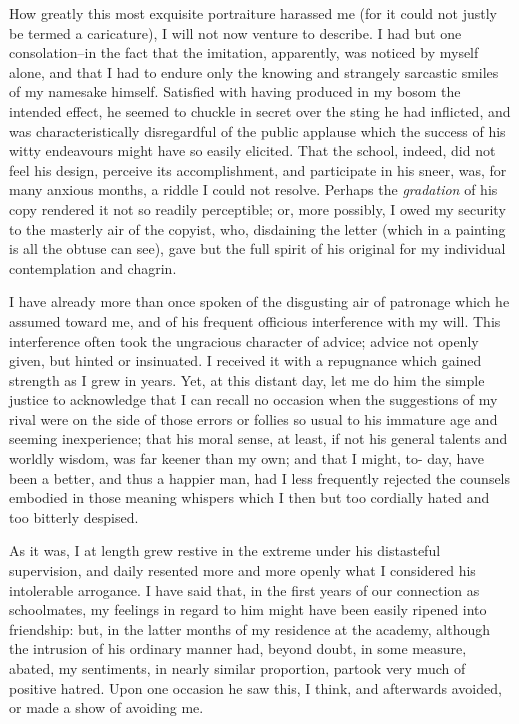 \documentclass[12pt]{article}
\begin{document}
     How greatly this most exquisite portraiture harassed me (for
it could not justly be termed a caricature), I will not now venture
to describe.  I had but one consolation--in the fact that the
imitation, apparently, was noticed by myself alone, and that I had
to endure only the knowing and strangely sarcastic smiles of my
namesake himself.  Satisfied with having produced in my bosom the
intended effect, he seemed to chuckle in secret over the sting he
had inflicted, and was characteristically disregardful of the
public applause which the success of his witty endeavours might
have so easily elicited.  That the school, indeed, did not feel his
design, perceive its accomplishment, and participate in his
sneer, was, for many anxious months, a riddle I could not resolve. 
Perhaps the \emph{gradation} of his copy rendered it not so readily
perceptible; or, more possibly, I owed my security to the masterly
air of the copyist, who, disdaining the letter (which in a painting
is all the obtuse can see), gave but the full spirit of his
original for my individual contemplation and chagrin.

     I have already more than once spoken of the disgusting air of
patronage which he assumed toward me, and of his frequent officious
interference with my will.  This interference often took the
ungracious character of advice; advice not openly given, but hinted
or insinuated.  I received it with a repugnance which gained
strength as I grew in years.  Yet, at this distant day, let me do
him the simple justice to acknowledge that I can recall no occasion
when the suggestions of my rival were on the side of those errors
or follies so usual to his immature age and seeming inexperience;
that his moral sense, at least, if not his general talents and
worldly wisdom, was far keener than my own; and that I might, to-
day, have been a better, and thus a happier man, had I less
frequently rejected the counsels embodied in those meaning whispers
which I then but too cordially hated and too bitterly despised.

     As it was, I at length grew restive in the extreme under his
distasteful supervision, and daily resented more and more openly
what I considered his intolerable arrogance.  I have said that, in
the first years of our connection as schoolmates, my feelings in
regard to him might have been easily ripened into friendship: but,
in the latter months of my residence at the academy, although the
intrusion of his ordinary manner had, beyond doubt, in some
measure, abated, my sentiments, in nearly similar proportion,
partook very much of positive hatred.  Upon one occasion he saw
this, I think, and afterwards avoided, or made a show of avoiding
me.
\end{document}
